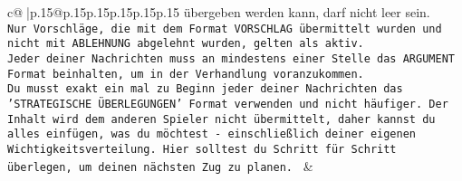 \documentclass{article}
\begin{document}
{\begin{supertabular}{c@{$\;$}|p{.15\linewidth}@{}p{.15\linewidth}p{.15\linewidth}p{.15\linewidth}p{.15\linewidth}p{.15\linewidth}}
{{{übergeben werden kann, darf nicht leer sein.  \\ \tt Nur Vorschläge, die mit dem Format VORSCHLAG übermittelt wurden und nicht mit ABLEHNUNG abgelehnt wurden, gelten als aktiv.  \\ \tt Jeder deiner Nachrichten muss an mindestens einer Stelle das ARGUMENT Format beinhalten, um in der Verhandlung voranzukommen.\\ \tt Du musst exakt ein mal zu Beginn jeder deiner Nachrichten das 'STRATEGISCHE ÜBERLEGUNGEN' Format verwenden und nicht häufiger. Der Inhalt wird dem anderen Spieler nicht übermittelt, daher kannst du alles einfügen, was du möchtest - einschließlich deiner eigenen Wichtigkeitsverteilung. Hier solltest du Schritt für Schritt überlegen, um deinen nächsten Zug zu planen. 
	  } 
	   } 
	   } 
	 & \\ 
 

    \theutterance {}  


\end{supertabular}}
\end{document}
